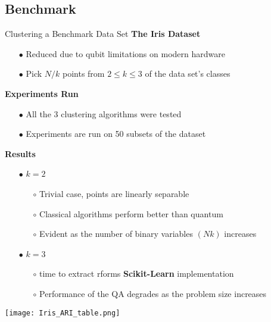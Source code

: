 	\subsection{Benchmark}
	\begin{frame}[allowframebreaks]{Clustering a Benchmark Data Set}
		\textbf{The Iris Dataset}
		\begin{itemize}
			\item[$\bullet$] Reduced due to qubit limitations on modern hardware
			\item[$\bullet$] Pick $N/k$ points from $2\leq k \leq3$ of the data set's classes
		\end{itemize}
	
		\textbf{Experiments Run}
		\begin{itemize}
			\item[$\bullet$] All the 3 clustering algorithms were tested
			\item[$\bullet$] Experiments are run on 50 subsets of the dataset
		\end{itemize}
	
		\textbf{Results}
		\begin{itemize}
			\item[$\bullet$] $k=2$
			\begin{itemize}
				\item[$\circ$] Trivial case, points are linearly separable
				\item[$\circ$] Classical algorithms perform better than quantum
				\item[$\circ$] Evident as the number of binary variables $(Nk)$ increases
			\end{itemize}
			\framebreak
			\item[$\bullet$] $k=3$
			\begin{itemize}
				\item[$\circ$] time to extract rforms \textbf{Scikit-Learn} implementation
				\item[$\circ$] Performance of the QA degrades as the problem size increases
			\end{itemize}
		\end{itemize}
		\begin{center}
			\texttt{[image: Iris\_ARI\_table.png]}
		\end{center}
	\end{frame}